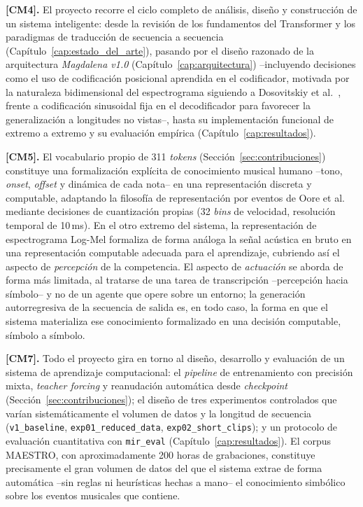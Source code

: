 \textbf{[CM4].} El proyecto recorre el ciclo completo de análisis,
diseño y construcción de un sistema inteligente: desde la revisión de
los fundamentos del Transformer y los paradigmas de traducción de
secuencia a secuencia (Capítulo~\ref{cap:estado_del_arte}), pasando
por el diseño razonado de la arquitectura \textit{Magdalena v1.0}
(Capítulo~\ref{cap:arquitectura}) --incluyendo decisiones como el uso
de codificación posicional aprendida en el codificador, motivada por
la naturaleza bidimensional del espectrograma siguiendo a Dosovitskiy
et al.\ \cite{dosovitskiy2021image}, frente a codificación sinusoidal
fija en el decodificador para favorecer la generalización a longitudes
no vistas--, hasta su implementación funcional de extremo a extremo y
su evaluación empírica (Capítulo~\ref{cap:resultados}).

\textbf{[CM5].} El vocabulario propio de 311 \textit{tokens}
(Sección~\ref{sec:contribuciones}) constituye una formalización
explícita de conocimiento musical humano --tono, \textit{onset},
\textit{offset} y dinámica de cada nota-- en una representación
discreta y computable, adaptando la filosofía de representación por
eventos de Oore et al.\ \cite{oore2020time} mediante decisiones de
cuantización propias (32 \textit{bins} de velocidad, resolución
temporal de 10\,ms). En el otro extremo del sistema, la
representación de espectrograma Log-Mel formaliza de forma análoga la
señal acústica en bruto en una representación computable adecuada
para el aprendizaje, cubriendo así el aspecto de \textit{percepción}
de la competencia. El aspecto de \textit{actuación} se aborda de
forma más limitada, al tratarse de una tarea de transcripción
--percepción hacia símbolo-- y no de un agente que opere sobre un
entorno; la generación autorregresiva de la secuencia de salida es, en
todo caso, la forma en que el sistema materializa ese conocimiento
formalizado en una decisión computable, símbolo a símbolo.

\textbf{[CM7].} Todo el proyecto gira en torno al diseño, desarrollo y
evaluación de un sistema de aprendizaje computacional: el
\textit{pipeline} de entrenamiento con precisión mixta, \textit{teacher
forcing} y reanudación automática desde \textit{checkpoint}
(Sección~\ref{sec:contribuciones}); el diseño de tres experimentos
controlados que varían sistemáticamente el volumen de datos y la
longitud de secuencia (\texttt{v1\_baseline},
\texttt{exp01\_reduced\_data}, \texttt{exp02\_short\_clips}); y un
protocolo de evaluación cuantitativa con \texttt{mir\_eval}
(Capítulo~\ref{cap:resultados}). El corpus MAESTRO, con
aproximadamente 200 horas de grabaciones, constituye precisamente el
gran volumen de datos del que el sistema extrae de forma automática
--sin reglas ni heurísticas hechas a mano-- el conocimiento simbólico
sobre los eventos musicales que contiene.


